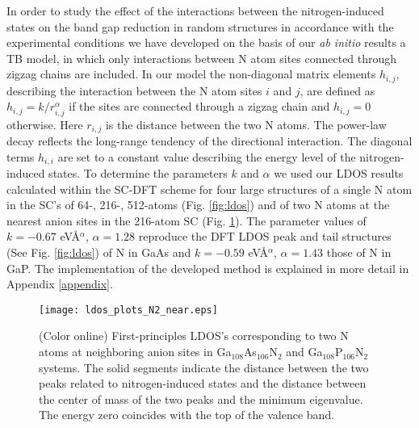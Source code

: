 \documentclass[aps,prb,10pt,twocolumn,groupedaddress]{revtex4-1}
\begin{document}
In order to study the effect of the interactions between the nitrogen-induced 
states on the band gap reduction in random structures in accordance 
with the
experimental conditions we have developed on the basis of our \textit{ab initio}
results a TB model, in which only interactions between N atom sites
connected through zigzag chains are included. In our model the non-diagonal
matrix elements $h_{i,j}$, describing the interaction between the N atom sites
$i$ and $j$, are defined as $h_{i,j}=k/r_{i,j}^{\alpha}$ if the sites are connected 
through a zigzag chain and $h_{i,j} = 0$ otherwise. Here $r_{i,j}$ is the distance
between the two N atoms. The power-law decay reflects the long-range tendency of
the directional interaction. The diagonal terms $h_{i,i}$ are set to a 
constant value describing the energy level of the nitrogen-induced states. 
To determine the
parameters $k$ and $\alpha$ we used our LDOS results calculated within the 
SC-DFT scheme for four large 
structures of a single N atom in the SC's of 64-, 216-, 512-atoms 
(Fig. \ref{fig:ldos}) and of two N 
atoms at the nearest anion sites in the 216-atom SC 
(Fig. \ref{fig:ldos_N2_near}). The parameter values of
$k=-0.67$ eV\r{A}$^\alpha$, $\alpha=1.28$ reproduce
the DFT LDOS peak and tail structures (See Fig. \ref{fig:ldos}) of N in GaAs
and $k=-0.59$ eV\r{A}$^\alpha$, $\alpha=1.43$ those of N in GaP. The 
implementation of the developed method is explained in more detail in 
Appendix \ref{appendix}.
\begin{figure}[!b]
  \centering
  \texttt{[image: ldos\_plots\_N2\_near.eps]}
  \caption{(Color online) First-principles LDOS's corresponding to two N atoms
at neighboring anion sites in Ga$_{108}$As$_{106}$N$_2$ and
Ga$_{108}$P$_{106}$N$_2$ systems. The solid segments indicate the distance between
the two peaks related to nitrogen-induced states and the distance between the 
center of mass of the two peaks and the minimum eigenvalue. The energy zero 
coincides with the top of the valence band.}
  \label{fig:ldos_N2_near}
\end{figure}
\end{document}
